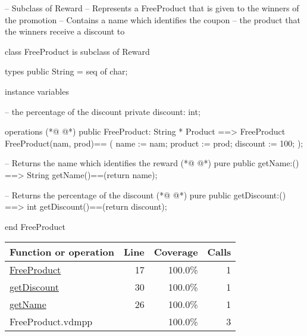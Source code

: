 \begin{vdmpp}[breaklines=true]
-- Subclass of Reward
-- Represents a FreeProduct that is given to the winners of the promotion
-- Contains a name which identifies the coupon
--      the product that the winners receive a discount to

class FreeProduct is subclass of Reward

  types
  public String = seq of char;
  
 instance variables
   
   -- the percentage of the discount
    private discount: int; 
    
  operations 
(*@
\label{FreeProduct:17}
@*)
   public FreeProduct: String * Product ==> FreeProduct
     FreeProduct(nam, prod)==
     (
     name := nam;
     product := prod;
     discount := 100;
     );
     
   -- Returns the name which identifies the reward  
(*@
\label{getName:26}
@*)
   pure public getName:() ==> String
   getName()==(return name);
     
   -- Returns the percentage of the discount
(*@
\label{getDiscount:30}
@*)
   pure public getDiscount:() ==> int
   getDiscount()==(return discount);
   
end FreeProduct
\end{vdmpp}
\bigskip
\begin{longtable}{|l|r|r|r|}
\hline
Function or operation & Line & Coverage & Calls \\
\hline
\hline
\hyperref[FreeProduct:17]{FreeProduct} & 17&100.0\% & 1 \\
\hline
\hyperref[getDiscount:30]{getDiscount} & 30&100.0\% & 1 \\
\hline
\hyperref[getName:26]{getName} & 26&100.0\% & 1 \\
\hline
\hline
FreeProduct.vdmpp & & 100.0\% & 3 \\
\hline
\end{longtable}

